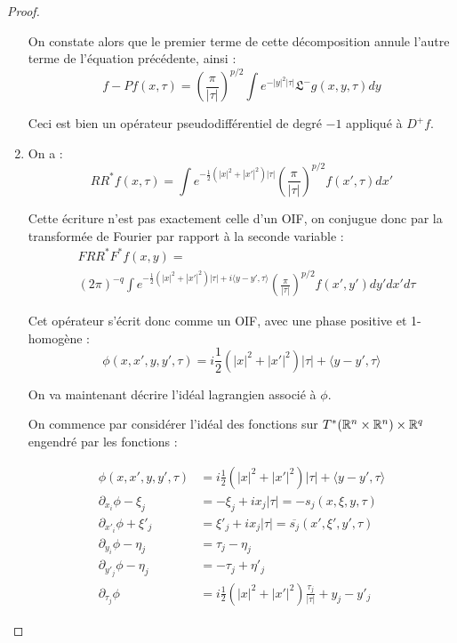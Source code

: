 \begin{proof}
\begin{enumerate}
  On constate alors que le premier terme de cette décomposition annule l'autre terme de l'équation précédente, ainsi :
  \begin{equation*}
    f-Pf(x,\tau) = \left(\frac{\pi}{|\tau|}\right)^{p/2}\int e^{-|y|^2|\tau|}\mathfrak{L}^- g(x,y,\tau) dy
  \end{equation*}
  
  Ceci est bien un opérateur pseudodifférentiel de degré $-1$ appliqué à $D^+f$.
  
  \item On a :
  \begin{equation*}
    RR^*f(x,\tau) = \int e^{-\frac 12 (|x|^2 + |x'|^2)|\tau|} \left(\frac{\pi}{|\tau|}\right)^{p/2} f(x',\tau)dx'
  \end{equation*}
  
  Cette écriture n'est pas exactement celle d'un OIF, on conjugue donc par la transformée de Fourier par rapport à la seconde variable :
  \begin{equation*}
  \begin{split}
    &FRR^*F^*f(x,y) = \\ &(2\pi)^{-q} \int e^{-\frac 12 (|x|^2 + |x'|^2)|\tau| + i\langle y-y', \tau \rangle} \left(\frac{\pi}{|\tau|}\right)^{p/2} f(x',y')dy'dx'd\tau
    \end{split}
  \end{equation*}
  
  Cet opérateur s'écrit donc comme un OIF, avec une phase positive et 1-homogène :
  \begin{equation*}
    \phi(x,x',y,y',\tau) = i\frac 12 (|x|^2 + |x'|^2)|\tau| + \langle y-y', \tau \rangle
  \end{equation*}
  
  On va maintenant décrire l'idéal lagrangien associé à $\phi$.
  
  On commence par considérer l'idéal des fonctions sur $T^*(\mathbb{R}^n \times \mathbb{R}^n) \times \mathbb{R}^q$ engendré par les fonctions :
  
  \begin{align*}
    \phi(x,x',y,y',\tau) &= i\frac 12 (|x|^2 + |x'|^2)|\tau| + \langle y-y', \tau \rangle\\
    \partial_{x_i}\phi - \xi_j &= -\xi_j + ix_j|\tau| = -s_j(x,\xi,y,\tau)\\
    \partial_{x'_i}\phi + \xi'_j &= \xi'_j + ix_j|\tau| = \overline{s_j}(x',\xi',y',\tau)\\
    \partial_{y_i}\phi - \eta_j &= \tau_j - \eta_j\\
    \partial_{y'_j}\phi - \eta_j &= -\tau_j + \eta'_j\\
    \partial_{\tau_j}\phi &= i \frac 12 (|x|^2 + |x'|^2)\frac{\tau_j}{|\tau|} + y_j-y'_j
  \end{align*}
  

\end{enumerate}
\end{proof}
